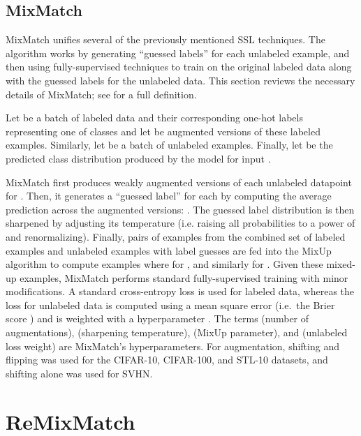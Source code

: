 \documentclass{article} \usepackage{iclr2020_conference,times}
\begin{document}
\subsection{MixMatch}

MixMatch \citep{berthelot2019mixmatch} unifies several of the previously mentioned SSL techniques.
The algorithm works by generating ``guessed labels'' for each unlabeled example, and then
using fully-supervised techniques to train on the original labeled data along with
the guessed labels for the unlabeled data.
This section reviews the necessary details of MixMatch; see \citep{berthelot2019mixmatch} for a full definition.

Let  be a batch of labeled data and their corresponding one-hot labels representing one of  classes and let  be augmented versions of these labeled examples.
Similarly, let  be a batch of unlabeled examples.
Finally, let  be the predicted class distribution produced by the model for input .

MixMatch first produces  weakly augmented versions of each unlabeled datapoint  for .
Then, it generates a ``guessed label''  for each  by computing the average prediction  across the  augmented versions: .
The guessed label distribution is then sharpened by adjusting its temperature (i.e. raising all probabilities to a power of  and renormalizing).
Finally, pairs of examples  from the combined set of labeled examples and unlabeled examples with label guesses are fed into the MixUp \citep{zhang2017mixup} algorithm to compute examples  where
 for , and similarly for .
Given these mixed-up examples, MixMatch performs standard fully-supervised training
with minor modifications.
A standard cross-entropy loss is used for labeled data, whereas the loss for unlabeled data is computed using a mean square error (i.e.\ the Brier score \citep{brier1950verification}) and is weighted with a hyperparameter .
The terms  (number of augmentations),  (sharpening temperature),  (MixUp  parameter), and  (unlabeled loss weight) are MixMatch's hyperparameters.
For augmentation, shifting and flipping was used for the CIFAR-10, CIFAR-100, and STL-10 datasets, and shifting alone was used for SVHN.

\section{ReMixMatch}
\end{document}
